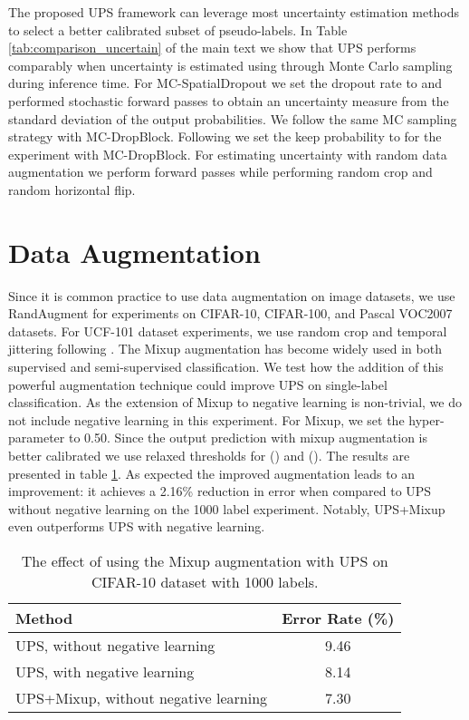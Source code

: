 \documentclass{article} \usepackage{iclr2021_conference,times}
\begin{document}
The proposed UPS framework can leverage most uncertainty estimation methods to select a better calibrated subset of pseudo-labels. In Table \ref{tab:comparison_uncertain} of the main text we show that UPS performs comparably when uncertainty is estimated using \citep{tompson2015efficient, NIPS2018_8271_DropBlock} through Monte Carlo sampling during inference time. For MC-SpatialDropout we set the dropout rate to  and performed  stochastic forward passes to obtain an uncertainty measure from the standard deviation of the output probabilities. We follow the same MC sampling strategy with MC-DropBlock. Following \citep{NIPS2018_8271_DropBlock} we set the keep probability to  for the experiment with MC-DropBlock. For estimating uncertainty with random data augmentation we perform  forward passes while performing random crop and random horizontal flip.  







\section{Data Augmentation}
\label{sec:data_aug}
Since it is common practice to use data augmentation on image datasets, we use RandAugment \citep{DBLP:journals/corr/abs-1909-13719} for experiments on CIFAR-10, CIFAR-100, and Pascal VOC2007 datasets. For UCF-101 dataset experiments, we use random crop and temporal jittering following \citep{jing2020videossl}. The Mixup augmentation \citep{zhang2018mixup} has become widely used in both supervised and semi-supervised classification. We test how the addition of this powerful augmentation technique could improve UPS on single-label classification. As the extension of Mixup to negative learning is non-trivial, we do not include negative learning in this experiment. For Mixup, we set the hyper-parameter  to 0.50. Since the output prediction with mixup augmentation is better calibrated \citep{thulasidasan2019mixup} we use relaxed thresholds for  () and  (). The results are presented in table \ref{tab:mixup}. As expected the improved augmentation leads to an improvement: it achieves a 2.16\% reduction in error when compared to UPS without negative learning on the 1000 label experiment. Notably, UPS+Mixup  even outperforms UPS with negative learning. 

\begin{table}[t]
\caption{The effect of using the Mixup augmentation with UPS on CIFAR-10 dataset with 1000 labels.
}
\begin{center}
\label{tab:mixup}
\small
\begin{tabular}{l|c}
\hline
Method & Error Rate (\%) \\ \hline
UPS, without negative learning  & 9.46 \\ 
UPS, with negative learning  &  8.14 \\ 
UPS+Mixup, without negative learning & 7.30  \\ 
\hline
\end{tabular}
\end{center}
\end{table}
\end{document}
